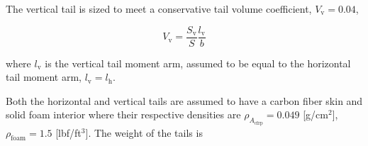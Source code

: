 % 
% 
% 
% 
% 
% 

The vertical tail is sized to meet a conservative tail volume coefficient, $V_{\text{v}}= 0.04$,\cite{aircraftrules}

\begin{equation}
    \label{e:vtv}
    V_{\text{v}} = \frac{S_{\text{v}}}{S} \frac{l_{\text{v}}}{b}
\end{equation}

where $l_{\text{v}}$ is the vertical tail moment arm, assumed to be equal to the horizontal tail moment arm, $l_{\text{v}} = l_{\text{h}}$.

Both the horizontal and vertical tails are assumed to have a carbon fiber skin and solid foam interior where their respective densities are $\rho_{A_{\text{cfrp}}} = 0.049$ [g/cm$^2$], $\rho_{\text{foam}} = 1.5$ [lbf/ft$^3$]. 
The weight of the \DIFdelbegin {}\DIFdelend tails is

